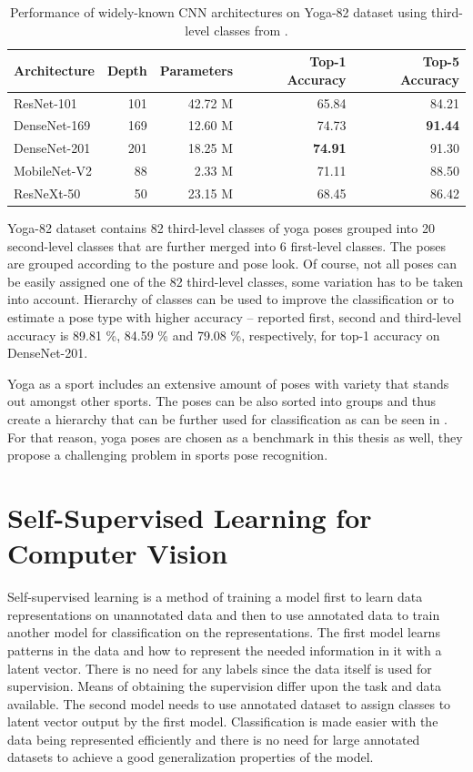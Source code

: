 \begin{table}[ht]
    \centering
    \begin{tabular}{l r r r r}
        \hline
        Architecture & Depth & Parameters & Top-1 Accuracy & Top-5 Accuracy \\
        \hline
        ResNet-101 & 101 & 42.72 M & 65.84 & 84.21 \\
        DenseNet-169 & 169 & 12.60 M & 74.73 & \textbf{91.44} \\
        DenseNet-201 & 201 & 18.25 M & \textbf{74.91} & 91.30 \\
        MobileNet-V2 & 88 & 2.33 M & 71.11 & 88.50 \\
        ResNeXt-50 & 50 & 23.15 M & 68.45 & 86.42 \\
        \hline
    \end{tabular}
    \caption{Performance of widely-known CNN architectures on Yoga-82 dataset using third-level classes from \cite{verma2020yoga}.}
    \label{tab:yoga82-results}
\end{table}

Yoga-82 dataset contains 82 third-level classes of yoga poses grouped into 20 second-level classes that are further merged into 6 first-level classes. The poses are grouped according to the posture and pose look. Of course, not all poses can be easily assigned one of the 82 third-level classes, some variation has to be taken into account. Hierarchy of classes can be used to improve the classification or to estimate a pose type with higher accuracy -- reported first, second and third-level accuracy is 89.81 \%, 84.59 \% and 79.08 \%, respectively, for top-1 accuracy on DenseNet-201.

Yoga as a sport includes an extensive amount of poses with variety that stands out amongst other sports. The poses can be also sorted into groups and thus create a hierarchy that can be further used for classification as can be seen in \cite{verma2020yoga}. For that reason, yoga poses are chosen as a benchmark in this thesis as well, they propose a challenging problem in sports pose recognition.

\section{\label{sec:self-supervised}Self-Supervised Learning for Computer Vision}

Self-supervised learning is a method of training a model first to learn data representations on unannotated data and then to use annotated data to train another model for classification on the representations. The first model learns patterns in the data and how to represent the needed information in it with a latent vector. There is no need for any labels since the data itself is used for supervision. Means of obtaining the supervision differ upon the task and data available. The second model needs to use annotated dataset to assign classes to latent vector output by the first model. Classification is made easier with the data being represented efficiently and there is no need for large annotated datasets to achieve a good generalization properties of the model.

